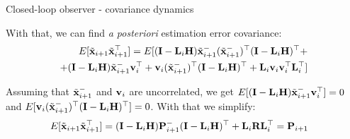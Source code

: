 \documentclass{beamer}
\begin{document}
\begin{frame}{Closed-loop observer - covariance dynamics}
	\begin{flushleft}
		
		
		With that, we can find \emph{a posteriori} estimation error covariance:
		\begin{align*}
			E[\Tilde{\mathbf{x}}_{i+1} \Tilde{\mathbf{x}}_{i+1}^\top] 
			=
			E[ (\mathbf{I} - \mathbf{L}_i \mathbf{H}) \Tilde{\mathbf{x}}_{i+1}^- (\Tilde{\mathbf{x}}_{i+1}^-)^\top (\mathbf{I} - \mathbf{L}_i \mathbf{H})^\top + \\
			+(\mathbf{I} - \mathbf{L}_i \mathbf{H}) \Tilde{\mathbf{x}}_{i+1}^- \mathbf{v}_i^\top +
			\mathbf{v}_i (\Tilde{\mathbf{x}}_{i+1}^-)^\top (\mathbf{I} - \mathbf{L}_i \mathbf{H})^\top +
			\mathbf{L}_i \mathbf{v}_i \mathbf{v}_i^\top \mathbf{L}_i^\top]
		\end{align*}
		
		Assuming that $\Tilde{\mathbf{x}}_{i+1}^-$ and $\mathbf{v}_i$ are uncorrelated, we get $E[(\mathbf{I} - \mathbf{L}_i \mathbf{H}) \Tilde{\mathbf{x}}_{i+1}^- \mathbf{v}_i^\top] = 0$ and $E[\mathbf{v}_i (\Tilde{\mathbf{x}}_{i+1}^-)^\top (\mathbf{I} - \mathbf{L}_i \mathbf{H})^\top] = 0$. With that we simplify:
		\begin{align*}
			E[\Tilde{\mathbf{x}}_{i+1} \Tilde{\mathbf{x}}_{i+1}^\top] 
			&=
			(\mathbf{I} - \mathbf{L}_i \mathbf{H}) \mathbf{P}_{i+1}^- (\mathbf{I} - \mathbf{L}_i \mathbf{H})^\top +\mathbf{L}_i\mathbf{R}\mathbf{L}_i^\top = \mathbf{P}_{i+1}
		\end{align*}
		
	\end{flushleft}
\end{frame}






\begin{frame}
	\begin{flushleft}
		
		
	\end{flushleft}
\end{frame}
\end{document}
